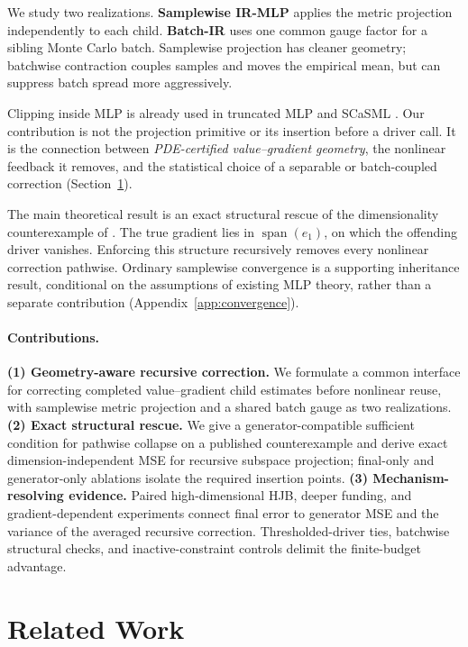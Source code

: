 \documentclass{article}
\begin{document}
We study two realizations. \textbf{Samplewise IR-MLP} applies the metric projection independently to each child. \textbf{Batch-IR} uses one common gauge factor for a sibling Monte Carlo batch. Samplewise projection has cleaner geometry; batchwise contraction couples samples and moves the empirical mean, but can suppress batch spread more aggressively.

Clipping inside MLP is already used in truncated MLP and SCaSML \citep{Beck2020,Fan2026}. Our contribution is not the projection primitive or its insertion before a driver call. It is the connection between \emph{PDE-certified value--gradient geometry}, the nonlinear feedback it removes, and the statistical choice of a separable or batch-coupled correction (Section~\ref{sec:related}).

The main theoretical result is an exact structural rescue of the dimensionality counterexample of \citet{HutzenthalerNguyen2025}. The true gradient lies in $\operatorname{span}(e_1)$, on which the offending driver vanishes. Enforcing this structure recursively removes every nonlinear correction pathwise. Ordinary samplewise convergence is a supporting inheritance result, conditional on the assumptions of existing MLP theory, rather than a separate contribution (Appendix~\ref{app:convergence}).

\paragraph{Contributions.}
\textbf{(1) Geometry-aware recursive correction.} We formulate a common interface for correcting completed value--gradient child estimates before nonlinear reuse, with samplewise metric projection and a shared batch gauge as two realizations.
\textbf{(2) Exact structural rescue.} We give a generator-compatible sufficient condition for pathwise collapse on a published counterexample and derive exact dimension-independent MSE for recursive subspace projection; final-only and generator-only ablations isolate the required insertion points.
\textbf{(3) Mechanism-resolving evidence.} Paired high-dimensional HJB, deeper funding, and gradient-dependent experiments connect final error to generator MSE and the variance of the averaged recursive correction. Thresholded-driver ties, batchwise structural checks, and inactive-constraint controls delimit the finite-budget advantage.

\section{Related Work}
\label{sec:related}
\end{document}
